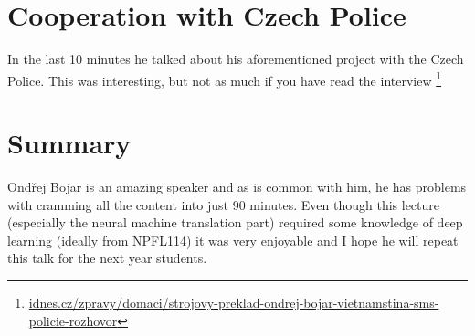 \documentclass[a4paper]{article}
\begin{document}
\section*{Cooperation with Czech Police}

In the last 10 minutes he talked about his aforementioned project with the Czech Police. This was interesting, but not as much if you have read the interview \footnote{\href{https://www.idnes.cz/zpravy/domaci/strojovy-preklad-ondrej-bojar-vietnamstina-sms-policie-rozhovor.A190207\_144212\_domaci\_brzy}{idnes.cz/zpravy/domaci/strojovy-preklad-ondrej-bojar-vietnamstina-sms-policie-rozhovor}}

\section*{Summary}

Ondřej Bojar is an amazing speaker and as is common with him, he has problems with cramming all the content into just 90 minutes. Even though this lecture (especially the neural machine translation part) required some knowledge of deep learning (ideally from NPFL114) it was very enjoyable and I hope he will repeat this talk for the next year students.
\end{document}
